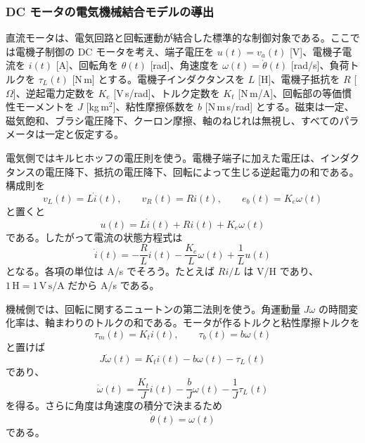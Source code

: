 \subsubsection{DC モータの電気機械結合モデルの導出}

直流モータは、電気回路と回転運動が結合した標準的な制御対象である。ここでは電機子制御の DC モータを考え、端子電圧を $u(t)=v_a(t)$ [V]、電機子電流を $i(t)$ [A]、回転角を $\theta(t)$ [rad]、角速度を $\omega(t)=\dot{\theta}(t)$ [rad/s]、負荷トルクを $\tau_L(t)$ [N\,m] とする。電機子インダクタンスを $L$ [H]、電機子抵抗を $R$ [$\Omega$]、逆起電力定数を $K_e$ [V\,s/rad]、トルク定数を $K_t$ [N\,m/A]、回転部の等価慣性モーメントを $J$ [kg\,m$^2$]、粘性摩擦係数を $b$ [N\,m\,s/rad] とする。磁束は一定、磁気飽和、ブラシ電圧降下、クーロン摩擦、軸のねじれは無視し、すべてのパラメータは一定と仮定する。

電気側ではキルヒホッフの電圧則を使う。電機子端子に加えた電圧は、インダクタンスの電圧降下、抵抗の電圧降下、回転によって生じる逆起電力の和である。構成則を
\begin{equation}
  v_L(t)=L\dot{i}(t),\qquad
  v_R(t)=Ri(t),\qquad
  e_b(t)=K_e\omega(t)
\end{equation}
と置くと
\begin{equation}
  u(t)=L\dot{i}(t)+Ri(t)+K_e\omega(t)
\end{equation}
である。したがって電流の状態方程式は
\begin{equation}
  \dot{i}(t)=-\frac{R}{L}i(t)-\frac{K_e}{L}\omega(t)+\frac{1}{L}u(t)
  \label{eq:dcmotor-current-state}
\end{equation}
となる。各項の単位は A/s でそろう。たとえば $R i/L$ は V/H であり、$1\,\mathrm{H}=1\,\mathrm{V\,s/A}$ だから A/s である。

機械側では、回転に関するニュートンの第二法則を使う。角運動量 $J\omega$ の時間変化率は、軸まわりのトルクの和である。モータが作るトルクと粘性摩擦トルクを
\begin{equation}
  \tau_m(t)=K_t i(t),\qquad
  \tau_b(t)=b\omega(t)
\end{equation}
と置けば
\begin{equation}
  J\dot{\omega}(t)=K_t i(t)-b\omega(t)-\tau_L(t)
\end{equation}
であり、
\begin{equation}
  \dot{\omega}(t)=\frac{K_t}{J}i(t)-\frac{b}{J}\omega(t)-\frac{1}{J}\tau_L(t)
  \label{eq:dcmotor-speed-state}
\end{equation}
を得る。さらに角度は角速度の積分で決まるため
\begin{equation}
  \dot{\theta}(t)=\omega(t)
  \label{eq:dcmotor-angle-state}
\end{equation}
である。

